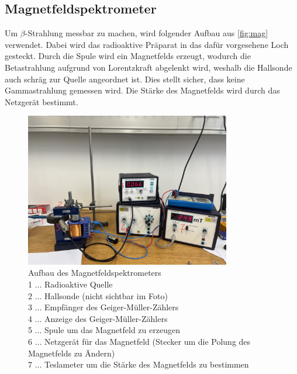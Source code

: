 \documentclass[12pt,english,ngerman]{scrartcl}
\begin{document}
\subsection{Magnetfeldspektrometer}\label{sec:aufbau_Magnetfeldspektrometer}

Um \(\beta\)-Strahlung messbar zu machen, wird folgender Aufbau aus
\autoref{fig:mag} verwendet. Dabei wird das radioaktive Präparat in das dafür
vorgesehene Loch gesteckt. Durch die Spule wird ein Magnetfelds erzeugt,
wodurch die Betastrahlung aufgrund von Lorentzkraft abgelenkt wird, weshalb die
Hallsonde auch schräg zur Quelle angeordnet ist. Dies stellt sicher, dass keine
Gammastrahlung gemessen wird. Die Stärke des Magnetfelds wird durch das
Netzgerät bestimmt.

\begin{figure}[H]
	\begin{center}
		\includegraphics[width = 0.8\textwidth]{./figures/mag_new.png}
	\end{center}
	\caption[Aufbau des Magnetfeldspektrometers]{Aufbau des Magnetfeldspektrometers \\
		1 \(\dots\) Radioaktive Quelle \\
		2 \(\dots\) Hallsonde (nicht sichtbar im Foto) \\
		3 \(\dots\) Empfänger des Geiger-Müller-Zählers \\
		4 \(\dots\) Anzeige des Geiger-Müller-Zählers \\
		5 \(\dots\) Spule um das Magnetfeld zu erzeugen \\
		6 \(\dots\) Netzgerät für das Magnetfeld (Stecker um die Polung des Magnetfelds zu Ändern) \\
		7 \(\dots\) Teslameter um die Stärke des Magnetfelds zu bestimmen}
	\label{fig:mag}

\end{figure}
\end{document}
